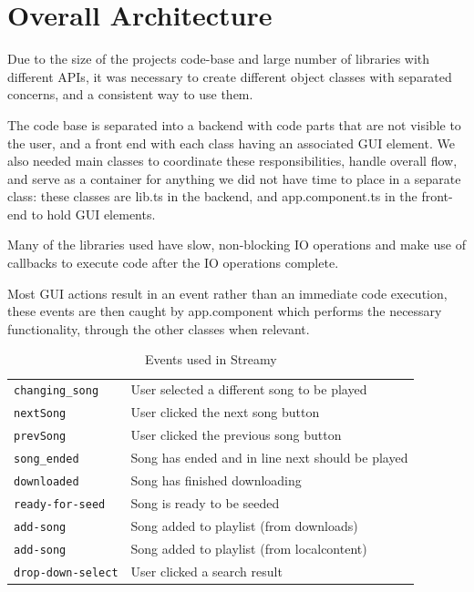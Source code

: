 \section{Overall Architecture}
Due to the size of the projects code-base and large number of libraries with different \acs{API}s, 
it was necessary to create different object classes with separated concerns,
and a consistent way to use them.

The code base is separated into a backend with code parts that are not visible to the user,
and a front end with each class having an associated \acs{GUI} element.
We also needed main classes to coordinate these responsibilities, handle overall flow,
and serve as a container for anything we did not have time to place in a separate class:
these classes are lib.ts in the backend,
and app.component.ts in the front-end to hold \acs{GUI} elements.

Many of the libraries used have slow, non-blocking IO operations
and make use of callbacks to execute code after the IO operations complete.

Most \acs{GUI} actions result in an event rather than an immediate code execution, 
these events are then caught by app.component
which performs the necessary functionality, through the other classes when relevant.

\begin{table}[H]
	\centering
	\begin{tabular}{l | l}
	    \verb|changing_song|    & User selected a different song to be played \\
		\verb|nextSong|         & User clicked the next song button \\
		\verb|prevSong|         & User clicked the previous song button \\
		\verb|song_ended|       & Song has ended and in line next should be played \\
		\verb|downloaded|       & Song has finished downloading \\
		\verb|ready-for-seed|   & Song is ready to be seeded \\
		\verb|add-song|         & Song added to playlist (from downloads) \\
		\verb|add-song|         & Song added to playlist (from localcontent) \\
		\verb|drop-down-select| & User clicked a search result \\
	\end{tabular}
	\caption{Events used in Streamy}
	\label{table:events}
\end{table}

